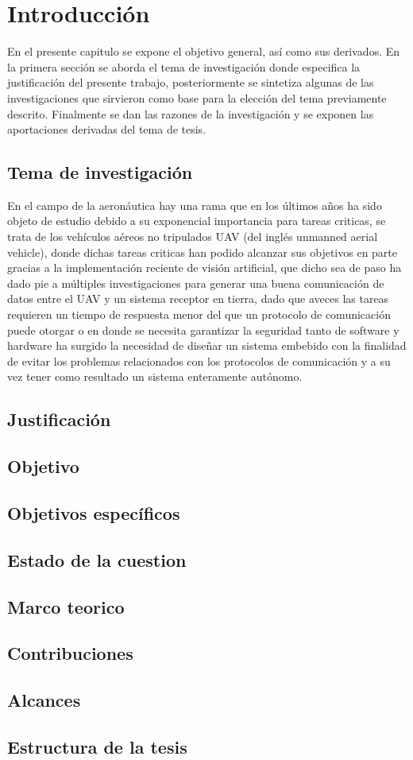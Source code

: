 \chapter{Introducción}
En el presente capitulo se expone el objetivo general, así como sus derivados. En la
primera sección se aborda el tema de investigación donde especifica la justificación del
presente trabajo, posteriormente se sintetiza algunas de las investigaciones que sirvieron
como base para la elección del tema previamente descrito. Finalmente se dan las razones
de la investigación y se exponen las aportaciones derivadas del tema de tesis.

\section{Tema de investigación}
En el campo de la aeronáutica hay una rama que en los últimos años ha sido objeto
de estudio debido a su exponencial importancia para tareas criticas, se trata de los
vehículos aéreos no tripulados UAV (del inglés unmanned aerial vehicle), donde dichas 
tareas criticas han podido alcanzar sus objetivos en parte gracias a la implementación
reciente de visión artificial, que dicho sea de paso ha dado pie a múltiples investigaciones
para generar una buena comunicación de datos entre el UAV y un sistema receptor en
tierra, dado que aveces las tareas requieren un tiempo de respuesta menor del que un
protocolo de comunicación puede otorgar o en donde se necesita garantizar la seguridad
tanto de software y hardware ha surgido la necesidad de diseñar un sistema embebido
con la finalidad de evitar los problemas relacionados con los protocolos de comunicación
y a su vez tener como resultado un sistema enteramente autónomo.

\section{Justificación}

\section{Objetivo}

\section{Objetivos específicos}

\section{Estado de la cuestion}

\section{Marco teorico}

\section{Contribuciones}

\section{Alcances}

\section{Estructura de la tesis}